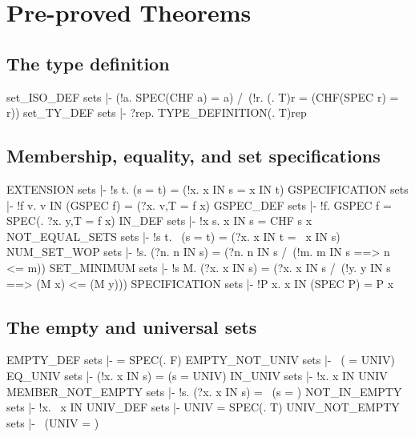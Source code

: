 \chapter{Pre-proved Theorems}

\section{The type definition}
\THEOREM set\_ISO\_DEF sets
|- (!a. SPEC(CHF a) = a) /\ (!r. (\p. T)r = (CHF(SPEC r) = r))
\ENDTHEOREM
\THEOREM set\_TY\_DEF sets
|- ?rep. TYPE_DEFINITION(\p. T)rep
\ENDTHEOREM
\section{Membership, equality, and set specifications}
\THEOREM EXTENSION sets
|- !s t. (s = t) = (!x. x IN s = x IN t)
\ENDTHEOREM
\THEOREM GSPECIFICATION sets
|- !f v. v IN (GSPEC f) = (?x. v,T = f x)
\ENDTHEOREM
\THEOREM GSPEC\_DEF sets
|- !f. GSPEC f = SPEC(\y. ?x. y,T = f x)
\ENDTHEOREM
\THEOREM IN\_DEF sets
|- !x s. x IN s = CHF s x
\ENDTHEOREM
\THEOREM NOT\_EQUAL\_SETS sets
|- !s t. ~(s = t) = (?x. x IN t = ~x IN s)
\ENDTHEOREM
\THEOREM NUM\_SET\_WOP sets
|- !s. (?n. n IN s) = (?n. n IN s /\ (!m. m IN s ==> n <= m))
\ENDTHEOREM
\THEOREM SET\_MINIMUM sets
|- !s M. (?x. x IN s) = (?x. x IN s /\ (!y. y IN s ==> (M x) <= (M y)))
\ENDTHEOREM
\THEOREM SPECIFICATION sets
|- !P x. x IN (SPEC P) = P x
\ENDTHEOREM
\section{The empty and universal sets}
\THEOREM EMPTY\_DEF sets
|- {} = SPEC(\x. F)
\ENDTHEOREM
\THEOREM EMPTY\_NOT\_UNIV sets
|- ~({} = UNIV)
\ENDTHEOREM
\THEOREM EQ\_UNIV sets
|- (!x. x IN s) = (s = UNIV)
\ENDTHEOREM
\THEOREM IN\_UNIV sets
|- !x. x IN UNIV
\ENDTHEOREM
\THEOREM MEMBER\_NOT\_EMPTY sets
|- !s. (?x. x IN s) = ~(s = {})
\ENDTHEOREM
\THEOREM NOT\_IN\_EMPTY sets
|- !x. ~x IN {}
\ENDTHEOREM
\THEOREM UNIV\_DEF sets
|- UNIV = SPEC(\x. T)
\ENDTHEOREM
\THEOREM UNIV\_NOT\_EMPTY sets
|- ~(UNIV = {})
\ENDTHEOREM
